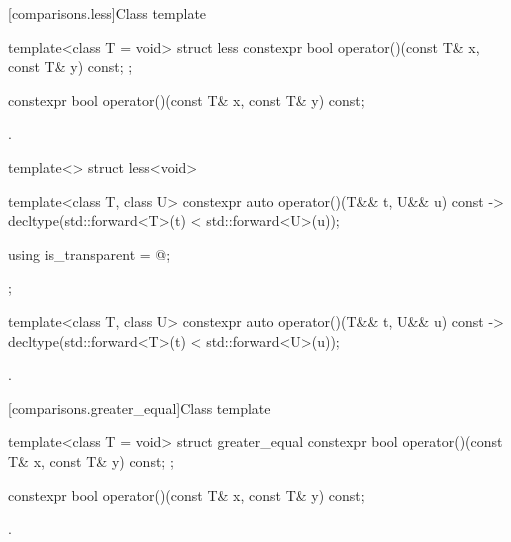 [comparisons.less]{Class template }

%
\begin{itemdecl}
template<class T = void> struct less {
  constexpr bool operator()(const T& x, const T& y) const;
};
\end{itemdecl}

%
\begin{itemdecl}
constexpr bool operator()(const T& x, const T& y) const;
\end{itemdecl}

\begin{itemdescr}
\pnum\returns {}.
\end{itemdescr}

%
\begin{itemdecl}
template<> struct less<void> {
  template<class T, class U> constexpr auto operator()(T&& t, U&& u) const
    -> decltype(std::forward<T>(t) < std::forward<U>(u));

  using is_transparent = @\unspec@;
};
\end{itemdecl}

%
\begin{itemdecl}
template<class T, class U> constexpr auto operator()(T&& t, U&& u) const
    -> decltype(std::forward<T>(t) < std::forward<U>(u));
\end{itemdecl}

\begin{itemdescr}
\pnum\returns {}.
\end{itemdescr}

[comparisons.greater_equal]{Class template }

%
\begin{itemdecl}
template<class T = void> struct greater_equal {
  constexpr bool operator()(const T& x, const T& y) const;
};
\end{itemdecl}

%
\begin{itemdecl}
constexpr bool operator()(const T& x, const T& y) const;
\end{itemdecl}

\begin{itemdescr}
\pnum\returns {}.
\end{itemdescr}

